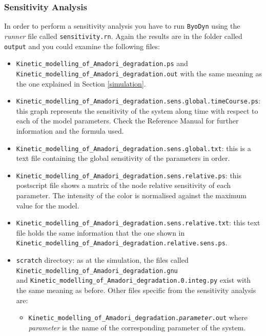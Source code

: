 \documentclass[a4paper, 11pt]{article}
\begin{document}
  \subsubsection{Sensitivity Analysis}
  In order to perform a sensitivity analysis you have to run \texttt{ByoDyn} using the \emph{runner} file called \texttt{sensitivity.rn}.
  Again the results are in the folder called \texttt{output} and you could examine the following files:
  \begin{itemize}
  \item
    \texttt{Kinetic\_modelling\_of\_Amadori\_degradation.ps} and \\ \texttt{Kinetic\_modelling\_of\_Amadori\_degradation.out} with the same meaning as the one explained in Section \ref{simulation}.
  \item
    \texttt{Kinetic\_modelling\_of\_Amadori\_degradation.sens.global.timeCourse.ps}: this graph represents the sensitivity of the system along time with respect to each of the model parameters. Check the Reference Manual for further information and the formula used.
  \item
    \texttt{Kinetic\_modelling\_of\_Amadori\_degradation.sens.global.txt}: this is a text file containing the global sensitivity of the parameters in order.
  \item
    \texttt{Kinetic\_modelling\_of\_Amadori\_degradation.sens.relative.ps}: this postscript file shows a matrix of the node relative sensitivity of each parameter.
    The intensity of the color is normalised against the maximum value for the model.
  \item
    \texttt{Kinetic\_modelling\_of\_Amadori\_degradation.sens.relative.txt}: this text file holds the same information that the one shown in \\ \texttt{Kinetic\_modelling\_of\_Amadori\_degradation.relative.sens.ps}.
  \item
    \texttt{scratch} directory: as at the simulation, the files called \\ \texttt{Kinetic\_modelling\_of\_Amadori\_degradation.gnu} \\ and \texttt{Kinetic\_modelling\_of\_Amadori\_degradation.0.integ.py} exist with the same meaning as before. 
    Other files specific from the sensitivity analysis are:
    \begin{itemize}
    \item
      \texttt{Kinetic\_modelling\_of\_Amadori\_degradation.\textit{parameter}.out} where \textit{parameter} is the name of the corresponding parameter of the system. 

\end{itemize}
\end{itemize}
\end{document}
